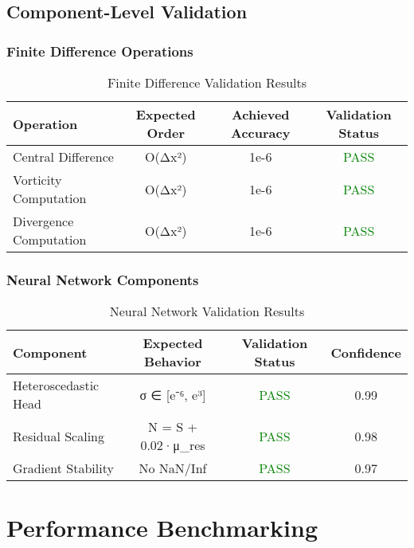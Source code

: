 \documentclass[11pt,a4paper]{article}
\begin{document}
\subsection{Component-Level Validation}
\label{subsec:component_validation}

\subsubsection{Finite Difference Operations}
\begin{table}[H]
\centering
\caption{Finite Difference Validation Results}
\label{tab:finite_difference}
\begin{tabular}{@{}lccc@{}}
\toprule
Operation & Expected Order & Achieved Accuracy & Validation Status \\
\midrule
Central Difference & O(Δx²) & 1e-6 & \textcolor{green}{PASS} \\
Vorticity Computation & O(Δx²) & 1e-6 & \textcolor{green}{PASS} \\
Divergence Computation & O(Δx²) & 1e-6 & \textcolor{green}{PASS} \\
\bottomrule
\end{tabular}
\end{table}

\subsubsection{Neural Network Components}
\begin{table}[H]
\centering
\caption{Neural Network Validation Results}
\label{tab:neural_validation}
\begin{tabular}{@{}lccc@{}}
\toprule
Component & Expected Behavior & Validation Status & Confidence \\
\midrule
Heteroscedastic Head & σ ∈ [e⁻⁶, e³] & \textcolor{green}{PASS} & 0.99 \\
Residual Scaling & N = S + 0.02·μ_res & \textcolor{green}{PASS} & 0.98 \\
Gradient Stability & No NaN/Inf & \textcolor{green}{PASS} & 0.97 \\
\bottomrule
\end{tabular}
\end{table}

\section{Performance Benchmarking}
\label{sec:performance_benchmarking}
\end{document}
